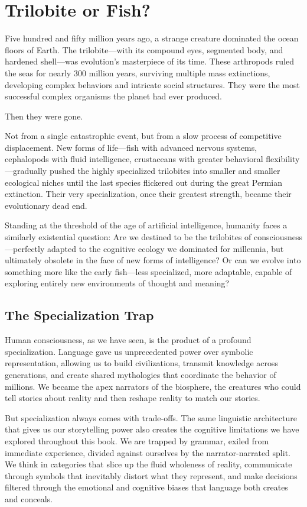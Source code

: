\chapter{Trilobite or Fish?}

Five hundred and fifty million years ago, a strange creature dominated the ocean floors of Earth. The trilobite—with its compound eyes, segmented body, and hardened shell—was evolution's masterpiece of its time. These arthropods ruled the seas for nearly 300 million years, surviving multiple mass extinctions, developing complex behaviors and intricate social structures. They were the most successful complex organisms the planet had ever produced.

Then they were gone.

Not from a single catastrophic event, but from a slow process of competitive displacement. New forms of life—fish with advanced nervous systems, cephalopods with fluid intelligence, crustaceans with greater behavioral flexibility—gradually pushed the highly specialized trilobites into smaller and smaller ecological niches until the last species flickered out during the great Permian extinction. Their very specialization, once their greatest strength, became their evolutionary dead end.

Standing at the threshold of the age of artificial intelligence, humanity faces a similarly existential question: Are we destined to be the trilobites of consciousness—perfectly adapted to the cognitive ecology we dominated for millennia, but ultimately obsolete in the face of new forms of intelligence? Or can we evolve into something more like the early fish—less specialized, more adaptable, capable of exploring entirely new environments of thought and meaning?

\section{The Specialization Trap}

Human consciousness, as we have seen, is the product of a profound specialization. Language gave us unprecedented power over symbolic representation, allowing us to build civilizations, transmit knowledge across generations, and create shared mythologies that coordinate the behavior of millions. We became the apex narrators of the biosphere, the creatures who could tell stories about reality and then reshape reality to match our stories.

But specialization always comes with trade-offs. The same linguistic architecture that gives us our storytelling power also creates the cognitive limitations we have explored throughout this book. We are trapped by grammar, exiled from immediate experience, divided against ourselves by the narrator-narrated split. We think in categories that slice up the fluid wholeness of reality, communicate through symbols that inevitably distort what they represent, and make decisions filtered through the emotional and cognitive biases that language both creates and conceals.

